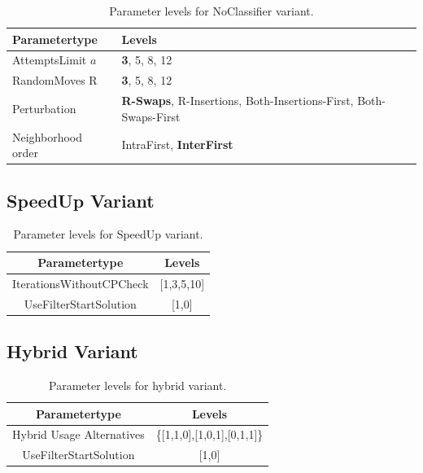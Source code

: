 \begin{table}[ht]
    \centering
    \setlength{\tabcolsep}{2em}
    \def\arraystretch{1.1}
    \begin{tabular}{@{}P{4cm}P{8cm}@{}}
        \toprule
        Parametertype      & Levels                                                                  \\
        \midrule
        AttemptsLimit $a$  & \textbf{3}, 5, 8, 12                                                    \\
        RandomMoves R      & \textbf{3}, 5, 8, 12                                                    \\
        Perturbation       & \textbf{R-Swaps}, R-Insertions, Both-Insertions-First, Both-Swaps-First \\
        Neighborhood order & IntraFirst, \textbf{InterFirst}                                         \\
        \bottomrule
    \end{tabular}
    \caption{Parameter levels for NoClassifier variant.}
    \label{tab:parameters_noclassifier}
\end{table}


\clearpage
\subsection{SpeedUp Variant}
\label{subsec_parameterStuy_speedup}

\begin{table}[ht]
    \centering
    \begin{tabular}{c c }
        \toprule
        Parametertype            & Levels     \\
        \midrule
        IterationsWithoutCPCheck & [1,3,5,10] \\
        UseFilterStartSolution   & [1,0]      \\
        \bottomrule
    \end{tabular}
    \caption{Parameter levels for SpeedUp variant.}
    \label{tab:parameters_speedup}
\end{table}

\subsection{Hybrid Variant}
\label{subsec_parameterStuy_hybrid}

\begin{table}[ht]
    \centering
    \begin{tabular}{c c }
        \toprule
        Parametertype             & Levels                      \\
        \midrule
        Hybrid Usage Alternatives & \{[1,1,0],[1,0,1],[0,1,1]\} \\
        UseFilterStartSolution    & [1,0]                       \\
        \bottomrule
    \end{tabular}
    \caption{Parameter levels for hybrid variant.}
    \label{tab:parameters_hybrid}
\end{table}